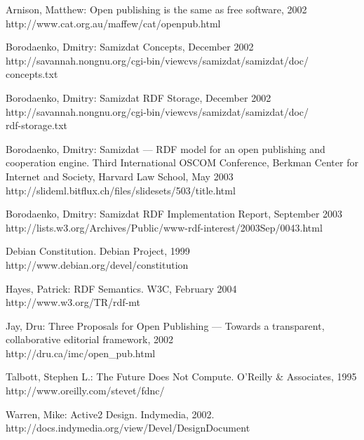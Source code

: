 \documentclass{llncs}
\begin{document}
%
\begin{thebibliography}{19}
%
Arnison, Matthew:
Open publishing is the same as free software, 2002\\
http://www.cat.org.au/maffew/cat/openpub.html

Borodaenko, Dmitry:
Samizdat Concepts, December 2002\\
http://savannah.nongnu.org/cgi-bin/viewcvs/samizdat/samizdat/doc/\\
concepts.txt

Borodaenko, Dmitry:
Samizdat RDF Storage, December 2002\\
http://savannah.nongnu.org/cgi-bin/viewcvs/samizdat/samizdat/doc/\\
rdf-storage.txt

Borodaenko, Dmitry:
Samizdat --- RDF model for an open publishing and cooperation engine. Third
International OSCOM Conference, Berkman Center for Internet and Society,
Harvard Law School, May 2003\\
http://slideml.bitflux.ch/files/slidesets/503/title.html

Borodaenko, Dmitry:
Samizdat RDF Implementation Report, September 2003\\
http://lists.w3.org/Archives/Public/www-rdf-interest/2003Sep/0043.html

Debian Constitution. Debian Project, 1999\\
http://www.debian.org/devel/constitution

Hayes, Patrick:
RDF Semantics. W3C, February 2004\\
http://www.w3.org/TR/rdf-mt

Jay, Dru:
Three Proposals for Open Publishing --- Towards a transparent, collaborative
editorial framework, 2002\\
http://dru.ca/imc/open\_pub.html

Talbott, Stephen L.:
The Future Does Not Compute. O'Reilly \& Associates, 1995\\
http://www.oreilly.com/\homedir{}stevet/fdnc/

Warren, Mike:
Active2 Design. Indymedia, 2002.\\
http://docs.indymedia.org/view/Devel/DesignDocument

\end{thebibliography}
\end{document}
